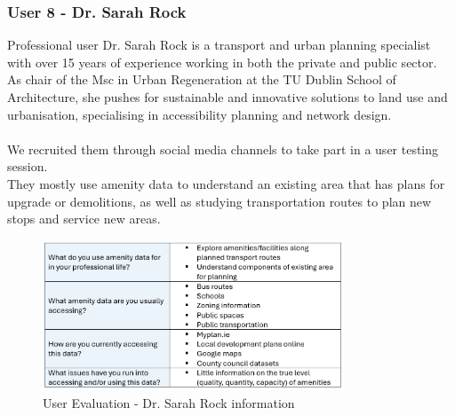 \newpage
\subsubsection{User 8 - Dr. Sarah Rock}
Professional user Dr. Sarah Rock is a transport and urban planning specialist with over 15 years of experience working in both the private and public sector. As chair of the Msc in Urban Regeneration at the TU Dublin School of Architecture, she pushes for sustainable and innovative solutions to land use and urbanisation, specialising in accessibility planning and network design.\\ \\
We recruited them through social media channels to take part in a user testing session.\\
They mostly use amenity data to understand an existing area that has plans for upgrade or demolitions, as well as studying transportation routes to plan new stops and service new areas.\\
\begin{figure}[h!]
    \centering
    \includegraphics[width=0.8\textwidth]{images/sarah-amenity-info.png}
    \caption{User Evaluation - Dr. Sarah Rock information}
\end{figure}

